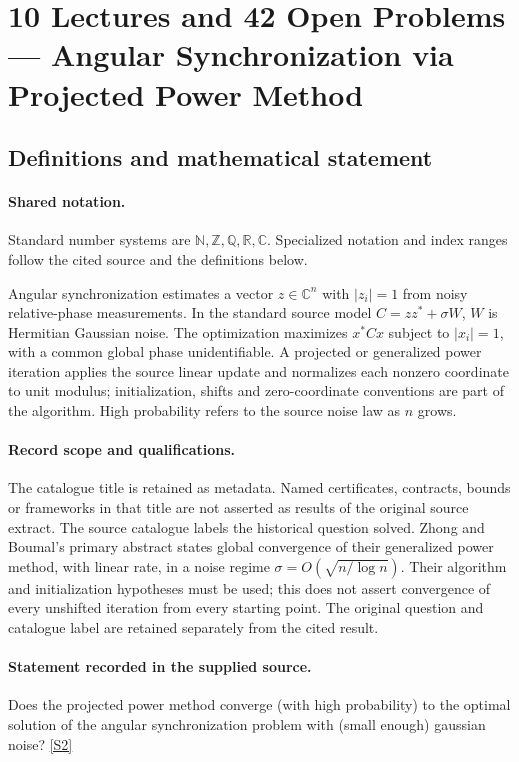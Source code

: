 \documentclass[11pt]{article}
\newcommand{\sref}[2]{\hyperlink{source:#1:#2}{[S#2]}}
\begin{document}
\section{10 Lectures and 42 Open Problems — Angular Synchronization via Projected Power Method}\label{statement}

\subsection{Definitions and mathematical statement}

\paragraph{Shared notation.}Standard number systems are $\mathbb N,\mathbb Z,\mathbb Q,\mathbb R,\mathbb C$. Specialized notation and index ranges follow the cited source and the definitions below.


Angular synchronization estimates a vector $z\in\mathbb C^n$ with $|z_i|=1$ from noisy relative-phase measurements. In the standard source model $C=zz^*+\sigma W$, $W$ is Hermitian Gaussian noise. The optimization maximizes $x^*Cx$ subject to $|x_i|=1$, with a common global phase unidentifiable. A projected or generalized power iteration applies the source linear update and normalizes each nonzero coordinate to unit modulus; initialization, shifts and zero-coordinate conventions are part of the algorithm. High probability refers to the source noise law as $n$ grows.
\paragraph{Record scope and qualifications.}
The catalogue title is retained as metadata. Named certificates, contracts, bounds or frameworks in that title are not asserted as results of the original source extract.
The source catalogue labels the historical question solved. Zhong and Boumal's primary abstract states global convergence of their generalized power method, with linear rate, in a noise regime $\sigma=O(\sqrt{n/\log n})$. Their algorithm and initialization hypotheses must be used; this does not assert convergence of every unshifted iteration from every starting point. The original question and catalogue label are retained separately from the cited result.
\paragraph{Statement recorded in the supplied source.}
Does the projected power method converge (with high probability) to the optimal solution of the angular synchronization problem with (small enough) gaussian noise? \sref{statement}{2}
\end{document}
